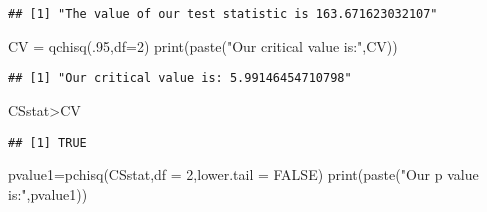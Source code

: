 \documentclass[
]{article}
\newenvironment{Shaded}{\begin{snugshade}}{\end{snugshade}}
\newcommand{\AttributeTok}[1]{\textcolor[rgb]{0.77,0.63,0.00}{#1}}
\newcommand{\ConstantTok}[1]{\textcolor[rgb]{0.00,0.00,0.00}{#1}}
\newcommand{\DecValTok}[1]{\textcolor[rgb]{0.00,0.00,0.81}{#1}}
\newcommand{\FunctionTok}[1]{\textcolor[rgb]{0.00,0.00,0.00}{#1}}
\newcommand{\NormalTok}[1]{#1}
\newcommand{\OtherTok}[1]{\textcolor[rgb]{0.56,0.35,0.01}{#1}}
\newcommand{\SpecialCharTok}[1]{\textcolor[rgb]{0.00,0.00,0.00}{#1}}
\newcommand{\StringTok}[1]{\textcolor[rgb]{0.31,0.60,0.02}{#1}}
\begin{document}
\begin{Shaded}
\end{Shaded}

\begin{verbatim}
## [1] "The value of our test statistic is 163.671623032107"
\end{verbatim}

\begin{Shaded}
\begin{Highlighting}[]
\NormalTok{CV }\OtherTok{=} \FunctionTok{qchisq}\NormalTok{(.}\DecValTok{95}\NormalTok{,}\AttributeTok{df=}\DecValTok{2}\NormalTok{)}
\FunctionTok{print}\NormalTok{(}\FunctionTok{paste}\NormalTok{(}\StringTok{"Our critical value is:"}\NormalTok{,CV))}
\end{Highlighting}
\end{Shaded}

\begin{verbatim}
## [1] "Our critical value is: 5.99146454710798"
\end{verbatim}

\begin{Shaded}
\begin{Highlighting}[]
\NormalTok{CSstat}\SpecialCharTok{\textgreater{}}\NormalTok{CV}
\end{Highlighting}
\end{Shaded}

\begin{verbatim}
## [1] TRUE
\end{verbatim}

\begin{Shaded}
\begin{Highlighting}[]
\NormalTok{pvalue1}\OtherTok{=}\FunctionTok{pchisq}\NormalTok{(CSstat,}\AttributeTok{df =} \DecValTok{2}\NormalTok{,}\AttributeTok{lower.tail =} \ConstantTok{FALSE}\NormalTok{)}
\FunctionTok{print}\NormalTok{(}\FunctionTok{paste}\NormalTok{(}\StringTok{"Our p value is:"}\NormalTok{,pvalue1))}
\end{Highlighting}
\end{Shaded}
\end{document}
